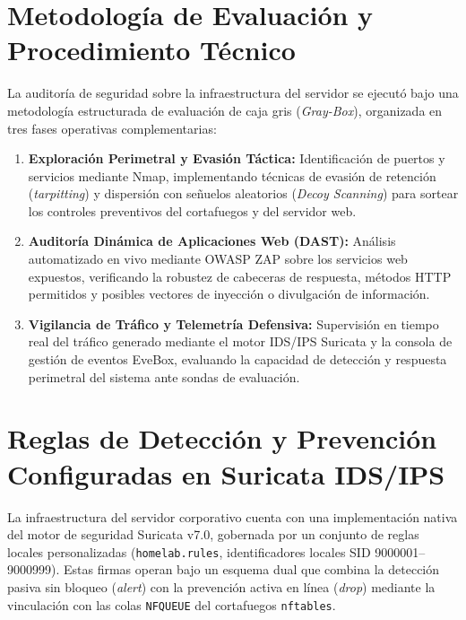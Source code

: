 
\section{Metodología de Evaluación y Procedimiento Técnico}

La auditoría de seguridad sobre la infraestructura del servidor se ejecutó bajo una metodología estructurada de evaluación de caja gris (\textit{Gray-Box}), organizada en tres fases operativas complementarias:

\begin{enumerate}
  \item \textbf{Exploración Perimetral y Evasión Táctica:} Identificación de puertos y servicios mediante Nmap, implementando técnicas de evasión de retención (\textit{tarpitting}) y dispersión con señuelos aleatorios (\textit{Decoy Scanning}) para sortear los controles preventivos del cortafuegos y del servidor web.
  \item \textbf{Auditoría Dinámica de Aplicaciones Web (DAST):} Análisis automatizado en vivo mediante OWASP ZAP sobre los servicios web expuestos, verificando la robustez de cabeceras de respuesta, métodos HTTP permitidos y posibles vectores de inyección o divulgación de información.
  \item \textbf{Vigilancia de Tráfico y Telemetría Defensiva:} Supervisión en tiempo real del tráfico generado mediante el motor IDS/IPS Suricata y la consola de gestión de eventos EveBox, evaluando la capacidad de detección y respuesta perimetral del sistema ante sondas de evaluación.
\end{enumerate}

\section{Reglas de Detección y Prevención Configuradas en Suricata IDS/IPS}

La infraestructura del servidor corporativo cuenta con una implementación nativa del motor de seguridad Suricata v7.0, gobernada por un conjunto de reglas locales personalizadas (\texttt{homelab.rules}, identificadores locales SID 9000001--9000999). Estas firmas operan bajo un esquema dual que combina la detección pasiva sin bloqueo (\textit{alert}) con la prevención activa en línea (\textit{drop}) mediante la vinculación con las colas \texttt{NFQUEUE} del cortafuegos \texttt{nftables}.


